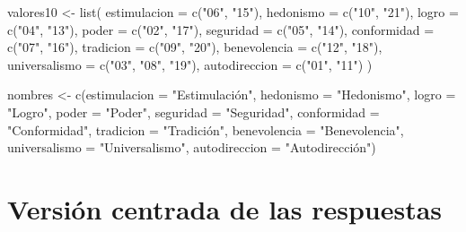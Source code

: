 \documentclass[
  spanish,
  a4paper,
  oneside]{scrbook}
\newenvironment{Shaded}{\begin{snugshade}}{\end{snugshade}}
\newcommand{\AttributeTok}[1]{\textcolor[rgb]{0.40,0.45,0.13}{#1}}
\newcommand{\FunctionTok}[1]{\textcolor[rgb]{0.28,0.35,0.67}{#1}}
\newcommand{\NormalTok}[1]{\textcolor[rgb]{0.00,0.23,0.31}{#1}}
\newcommand{\OtherTok}[1]{\textcolor[rgb]{0.00,0.23,0.31}{#1}}
\newcommand{\StringTok}[1]{\textcolor[rgb]{0.13,0.47,0.30}{#1}}
\begin{document}
\begin{Shaded}
\begin{Highlighting}[]
\NormalTok{valores10 }\OtherTok{\textless{}{-}} \FunctionTok{list}\NormalTok{(}
  \AttributeTok{estimulacion  =} \FunctionTok{c}\NormalTok{(}\StringTok{"06"}\NormalTok{, }\StringTok{"15"}\NormalTok{), }\AttributeTok{hedonismo     =} \FunctionTok{c}\NormalTok{(}\StringTok{"10"}\NormalTok{, }\StringTok{"21"}\NormalTok{),}
  \AttributeTok{logro         =} \FunctionTok{c}\NormalTok{(}\StringTok{"04"}\NormalTok{, }\StringTok{"13"}\NormalTok{), }\AttributeTok{poder         =} \FunctionTok{c}\NormalTok{(}\StringTok{"02"}\NormalTok{, }\StringTok{"17"}\NormalTok{),}
  \AttributeTok{seguridad     =} \FunctionTok{c}\NormalTok{(}\StringTok{"05"}\NormalTok{, }\StringTok{"14"}\NormalTok{), }\AttributeTok{conformidad   =} \FunctionTok{c}\NormalTok{(}\StringTok{"07"}\NormalTok{, }\StringTok{"16"}\NormalTok{),}
  \AttributeTok{tradicion     =} \FunctionTok{c}\NormalTok{(}\StringTok{"09"}\NormalTok{, }\StringTok{"20"}\NormalTok{), }\AttributeTok{benevolencia  =} \FunctionTok{c}\NormalTok{(}\StringTok{"12"}\NormalTok{, }\StringTok{"18"}\NormalTok{),}
  \AttributeTok{universalismo =} \FunctionTok{c}\NormalTok{(}\StringTok{"03"}\NormalTok{, }\StringTok{"08"}\NormalTok{, }\StringTok{"19"}\NormalTok{), }\AttributeTok{autodireccion =} \FunctionTok{c}\NormalTok{(}\StringTok{"01"}\NormalTok{, }\StringTok{"11"}\NormalTok{)}
\NormalTok{)}

\NormalTok{nombres }\OtherTok{\textless{}{-}} \FunctionTok{c}\NormalTok{(}\AttributeTok{estimulacion =} \StringTok{"Estimulación"}\NormalTok{, }\AttributeTok{hedonismo =} \StringTok{"Hedonismo"}\NormalTok{,}
             \AttributeTok{logro =} \StringTok{"Logro"}\NormalTok{, }\AttributeTok{poder =} \StringTok{"Poder"}\NormalTok{, }\AttributeTok{seguridad =} \StringTok{"Seguridad"}\NormalTok{,}
             \AttributeTok{conformidad =} \StringTok{"Conformidad"}\NormalTok{, }\AttributeTok{tradicion =} \StringTok{"Tradición"}\NormalTok{,}
             \AttributeTok{benevolencia =} \StringTok{"Benevolencia"}\NormalTok{, }\AttributeTok{universalismo =} \StringTok{"Universalismo"}\NormalTok{,}
             \AttributeTok{autodireccion =} \StringTok{"Autodirección"}\NormalTok{)}
\end{Highlighting}
\end{Shaded}

\section{Versión centrada de las
respuestas}\label{versiuxf3n-centrada-de-las-respuestas}
\end{document}
